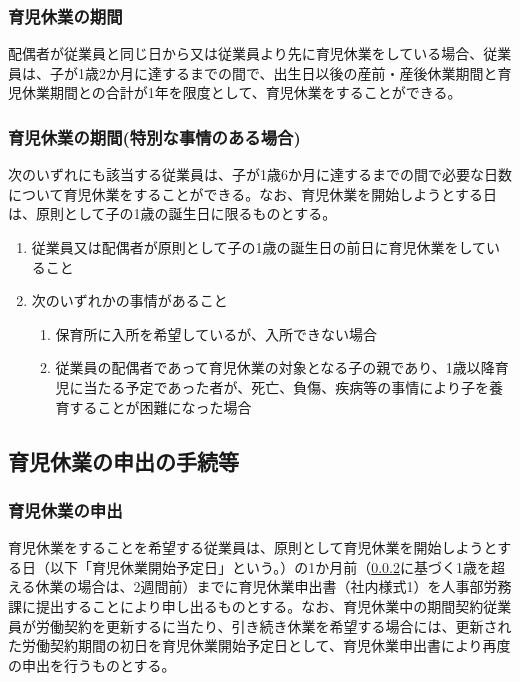 \documentclass{jsarticle}
\begin{document}
\subsubsection{育児休業の期間}
\label{育介_項_育児休業の期間}
配偶者が従業員と同じ日から又は従業員より先に育児休業をしている場合、従業員は、子が1歳2か月に達するまでの間で、出生日以後の産前・産後休業期間と育児休業期間との合計が1年を限度として、育児休業をすることができる。

\subsubsection{育児休業の期間(特別な事情のある場合)}
\label{育介_項_育児休業の期間(特別な事情のある場合)}
次のいずれにも該当する従業員は、子が1歳6か月に達するまでの間で必要な日数について育児休業をすることができる。なお、育児休業を開始しようとする日は、原則として子の1歳の誕生日に限るものとする。
\begin{enumerate}
  \item 従業員又は配偶者が原則として子の1歳の誕生日の前日に育児休業をしていること
  \item 次のいずれかの事情があること
    \begin{enumerate}
      \item 保育所に入所を希望しているが、入所できない場合
      \item 従業員の配偶者であって育児休業の対象となる子の親であり、1歳以降育児に当たる予定であった者が、死亡、負傷、疾病等の事情により子を養育することが困難になった場合
    \end{enumerate}
\end{enumerate}

\subsection{育児休業の申出の手続等}
\label{育介_条_育児休業の申出の手続等}

\subsubsection{育児休業の申出}
\label{育介_項_育児休業の申出}
育児休業をすることを希望する従業員は、原則として育児休業を開始しようとする日（以下「育児休業開始予定日」という。）の1か月前（\ref{育介_項_育児休業の期間(特別な事情のある場合)}に基づく1歳を超える休業の場合は、2週間前）までに育児休業申出書（社内様式1）を人事部労務課に提出することにより申し出るものとする。なお、育児休業中の期間契約従業員が労働契約を更新するに当たり、引き続き休業を希望する場合には、更新された労働契約期間の初日を育児休業開始予定日として、育児休業申出書により再度の申出を行うものとする。 
\end{document}
